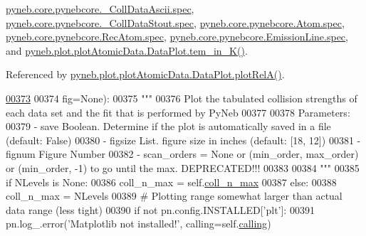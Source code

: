 \hyperlink{pynebcore_8py_source_l00928}{pyneb.\-core.\-pynebcore.\-\_\-\-Coll\-Data\-Ascii.\-spec}, \hyperlink{pynebcore_8py_source_l01164}{pyneb.\-core.\-pynebcore.\-\_\-\-Coll\-Data\-Stout.\-spec}, \hyperlink{pynebcore_8py_source_l01220}{pyneb.\-core.\-pynebcore.\-Atom.\-spec}, \hyperlink{pynebcore_8py_source_l02637}{pyneb.\-core.\-pynebcore.\-Rec\-Atom.\-spec}, \hyperlink{pynebcore_8py_source_l03390}{pyneb.\-core.\-pynebcore.\-Emission\-Line.\-spec}, and \hyperlink{plot_atomic_data_8py_source_l00478}{pyneb.\-plot.\-plot\-Atomic\-Data.\-Data\-Plot.\-tem\-\_\-in\-\_\-\-K()}.



Referenced by \hyperlink{plot_atomic_data_8py_source_l00262}{pyneb.\-plot.\-plot\-Atomic\-Data.\-Data\-Plot.\-plot\-Rel\-A()}.


\begin{DoxyCode}
\hypertarget{classpyneb_1_1plot_1_1plot_atomic_data_1_1_data_plot_l00373}{}\hyperlink{classpyneb_1_1plot_1_1plot_atomic_data_1_1_data_plot_a674c04e8512a9f5724c2af0df4e0a8fe}{00373} 
00374                   fig=\textcolor{keywordtype}{None}):
00375         \textcolor{stringliteral}{"""}
00376 \textcolor{stringliteral}{        Plot the tabulated collision strengths of each data set and the fit that is performed by PyNeb}
00377 \textcolor{stringliteral}{        }
00378 \textcolor{stringliteral}{        Parameters:}
00379 \textcolor{stringliteral}{            - save     Boolean. Determine if the plot is automatically saved in a file (default: False)}
00380 \textcolor{stringliteral}{            - figsize  List. figure size in inches (default: [18, 12])}
00381 \textcolor{stringliteral}{            - fignum   Figure Number}
00382 \textcolor{stringliteral}{            - scan\_orders = None or (min\_order, max\_order) or (min\_order, -1) to go until the max.
       DEPRECATED!!!}
00383 \textcolor{stringliteral}{}
00384 \textcolor{stringliteral}{        """}
00385         \textcolor{keywordflow}{if} NLevels \textcolor{keywordflow}{is} \textcolor{keywordtype}{None}:
00386             coll\_n\_max = self.\hyperlink{classpyneb_1_1plot_1_1plot_atomic_data_1_1_data_plot_aa15b01aa8da5eac903d797c2a1af3461}{coll\_n\_max}
00387         \textcolor{keywordflow}{else}:
00388             coll\_n\_max = NLevels
00389         \textcolor{comment}{# Plotting range somewhat larger than actual data range (less tight) }
00390         \textcolor{keywordflow}{if} \textcolor{keywordflow}{not} pn.config.INSTALLED[\textcolor{stringliteral}{'plt'}]:
00391             pn.log\_.error(\textcolor{stringliteral}{'Matplotlib not installed!'}, calling=self.\hyperlink{classpyneb_1_1plot_1_1plot_atomic_data_1_1_data_plot_a393a133b607541c57d5ebc5a34687e3f}{calling})

\end{DoxyCode}

